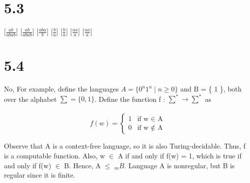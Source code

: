 \documentclass{scrartcl}
\begin{document}
\section*{5.3}
[$\frac{ab}{abab}$] [$\frac{ab}{abab}$] [$\frac{aba}{b}$] [$\frac{b}{a}$] [$\frac{b}{a}$] [$\frac{aa}{a}$] [$\frac{aa}{a}$] 

\section*{5.4}
No, For example, define the languages $A = \{0^n1^n \mid n \geq 0 \}$ and B = \{ 1 \}, both over the alphabet $\sum = \{ 0, 1\}$. Define the function f : $\sum^* \to \sum^*$ as\\
\\
\qquad 
\begin{equation}
f(w)=
\begin{cases}
1& \text{if w $\in$ A}\\
0& \text{if w $\notin$ A}
\end{cases}
\end{equation}

Observe that A is a context-free language, so it is also Turing-decidable. Thus, f is a
computable function. Also, w $\in$ A if and only if f(w) = 1, which is true if and only if f(w) $\in$ B. Hence, A $\leq$ $_mB$. Language A is nonregular, but B is regular since it is
finite.
\end{document}
